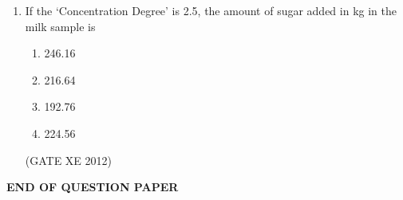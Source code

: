 \documentclass[12pt]{article}
\begin{document}
\begin{enumerate}
\item If the ‘Concentration Degree’ is 2.5, the amount of sugar added in kg in the milk sample is

\begin{multicols}{4}
\begin{enumerate}
\item 246.16
\item 216.64
\item 192.76
\item 224.56
\end{enumerate}
\end{multicols}
(GATE XE 2012)


\end{enumerate}

\begin{center}
    {\Large \textbf{END OF QUESTION PAPER}}
\end{center}
\end{document}
